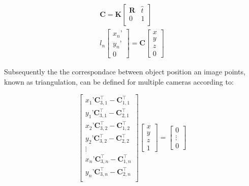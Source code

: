 \documentclass[5p,times,procedia]{elsarticle}
\begin{document}
\begin{align}
	\mathbf{C} = \mathbf{K}
	\begin{bmatrix}
		\mathbf{R} & \hat{t} \\
		0 & 1 \\
	\end{bmatrix} \\
	l_{n}
	\begin{bmatrix}
		x_n’ \\
		y_n’ \\
		0
	\end{bmatrix}
	= \mathbf{C}
	\begin{bmatrix}
		x \\
		y \\
		z \\
		0
	\end{bmatrix}
\end{align}

Subsequently the the correspondace between object position an image points, known as triangulation, can be defined for multiple cameras according to:


\begin{equation}
	\label{eqn:triangulation}
	\begin{bmatrix}
		x_{1}’ \mathbf{C}_{3,1}^{\top} - \mathbf{C}_{1,1}^{\top}\\
		y_{1}’ \mathbf{C}_{3,1}^{\top} - \mathbf{C}_{2,1}^{\top}\\
		x_{2}’ \mathbf{C}_{3,2}^{\top} - \mathbf{C}_{1,2}^{\top}\\
		y_{2}’ \mathbf{C}_{3,2}^{\top} - \mathbf{C}_{2,2}^{\top}\\
		\vdots \\
		x_{n}’ \mathbf{C}_{3,n}^{\top} - \mathbf{C}_{1,n}^{\top}\\
		y_{n}’ \mathbf{C}_{3,n}^{\top} - \mathbf{C}_{2,n}^{\top}\\
	\end{bmatrix}
	\begin{bmatrix}
		x \\
		y \\
		z \\
		1
	\end{bmatrix}
	=
	\begin{bmatrix}
		0 \\
		\vdots \\
		0
	\end{bmatrix}
\end{equation}
\end{document}
